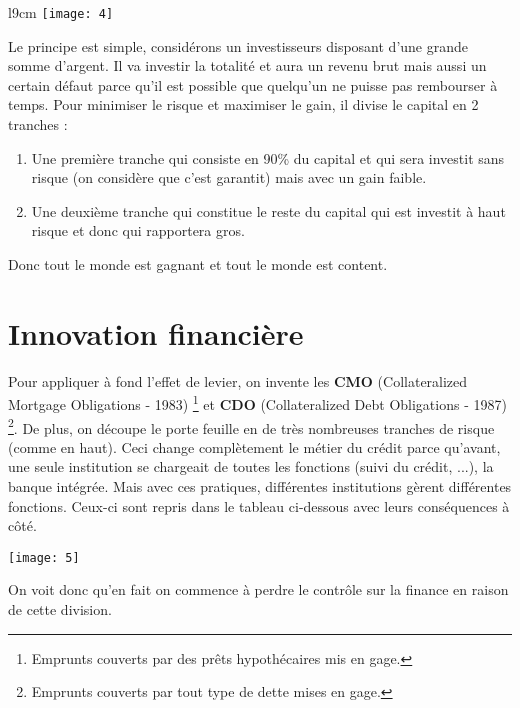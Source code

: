 \begin{wrapfigure}[10]{l}{9cm}
	\texttt{[image: 4]}
\end{wrapfigure}
Le principe est simple, considérons un investisseurs disposant d'une grande somme d'argent. Il va investir la totalité et aura un revenu brut mais aussi un certain défaut parce qu'il est possible que quelqu'un ne puisse pas rembourser à temps. Pour minimiser le risque et maximiser le gain, il divise le capital en 2 tranches :
\\
\begin{enumerate}
	\item Une première tranche qui consiste en 90\% du capital et qui sera investit sans risque (on considère que c'est garantit) mais avec un gain faible.
	      
	\item Une deuxième tranche qui constitue le reste du capital qui est investit à haut risque et donc qui rapportera gros. 
\end{enumerate}
Donc tout le monde est gagnant et tout le monde est content. 

\section{Innovation financière}
Pour appliquer à fond l'effet de levier, on invente les \textbf{CMO} (Collateralized Mortgage Obligations - 1983) \footnote{Emprunts couverts par des prêts hypothécaires mis en gage.} et \textbf{CDO} (Collateralized Debt Obligations - 1987) \footnote{Emprunts couverts par tout type de dette mises en gage.}. De plus, on découpe le porte feuille en de très nombreuses tranches de risque (comme en haut). Ceci change complètement le métier du crédit parce qu'avant, une seule institution se chargeait de toutes les fonctions (suivi du crédit, ...), la banque intégrée. Mais avec ces pratiques, différentes institutions gèrent différentes fonctions. Ceux-ci sont repris dans le tableau ci-dessous avec leurs conséquences à côté.

\begin{center}
	\texttt{[image: 5]}
\end{center}

On voit donc qu'en fait on commence à perdre le contrôle sur la finance en raison de cette division. 

